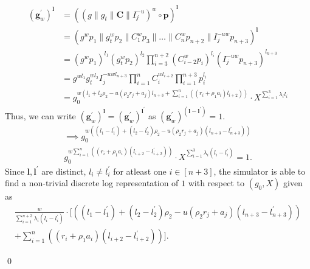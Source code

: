 \begin{align*}
(\textbf{g}_w^{\prime})^{\textbf{l}} &= ((g\|g_t\|\textbf{C}\|I_j^{-u})^w \circ \textbf{p})^{\textbf{l}}\\
&= (g^w p_1 \|g_t^w p_2 \| C_1^w p_3 \| \dots \| C_n^w p_{n+2} \|I_j^{-uw} p_{n+3} )^{\textbf{l}}\\
&= (g^w p_1)^{l_1} (g_t^w p_2)^{l_2} \prod_{i=3}^{n+2} (C_{i-2}^w p_{i})^{l_{i}} (I_j^{-uw} p_{n+3})^{l_{n+3}}\\
&= g^{w l_1} g_t^{w l_2} I_j^{-uwl_{n+3}} \prod_{i=1}^{n} C_{i}^{w l_{i+2}} \prod_{i=1}^{n+3} p_i^{l_i}\\
&= g_0^{w(l_1 + l_2 \rho_2 - u(\rho_2 r_j + a_j)l_{n+3} + \sum_{i=1}^{n}((r_i + \rho_1 a_i)l_{i+2}) )} \cdot X^{\sum_{i=1}^{3} \lambda_i l_i}
\end{align*}
\noindent Thus, we can write $(\textbf{g}_w^{\prime})^{\textbf{l}} = (\textbf{g}_w^{\prime})^{\textbf{l}^{\prime}}$ as $(\textbf{g}_w^{\prime})^{(\textbf{l} - \textbf{l}^{\prime})} = 1$. 
\begin{multline*}
\implies g_0^{w((l_1-l_1^{\prime}) + (l_2-l_2^{\prime}) \rho_2 - u(\rho_2 r_j + a_j)(l_{n+3}-l_{n+3}^{\prime}))} \\ 
g_0^{w\sum_{i=1}^{n}((r_i + \rho_1 a_i)(l_{i+2}-l_{i+2}^{\prime})) } \cdot X^{\sum_{i=1}^{3} \lambda_i (l_i-l_i^{\prime})} = 1.
\end{multline*}
\noindent Since $\textbf{l}, \textbf{l}^{\prime}$ are distinct, $l_i \neq l_i^{\prime}$ for atleast one $i \in [n+3]$, the simulator is 
able to find a non-trivial discrete log representation of $1$ with respect to $(g_0, X)$ given as
\begin{multline*}
\frac{w}{\sum_{i=1}^{n+3} \lambda_i (l_i-l_i^{\prime})} \cdot \Big[ \left((l_1-l_1^{\prime}) + (l_2-l_2^{\prime}) \rho_2 - u(\rho_2 r_j + a_j)(l_{n+3}-l_{n+3}^{\prime})\right) \\ + \sum_{i=1}^{n}\left((r_i + \rho_1 a_i)(l_{i+2}-l_{i+2}^{\prime})\right) \Big].
\end{multline*}
\begin{flushright}
\qed
\end{flushright}


  
